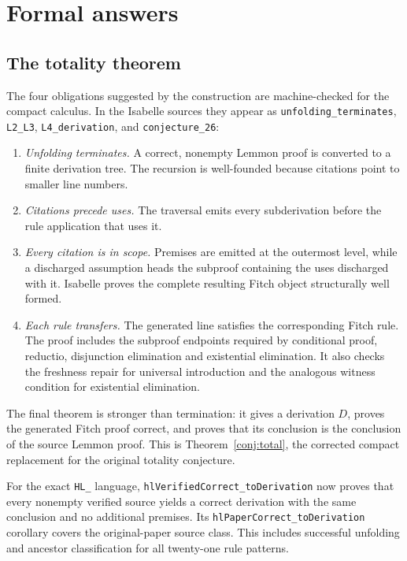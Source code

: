 \documentclass[11pt]{article}
\theoremstyle{plain}
\theoremstyle{definition}
\theoremstyle{remark}
\begin{document}
\section{Formal answers}\label{sec:open}

\subsection{The totality theorem}

The four obligations suggested by the construction are machine-checked for
the compact calculus. In the Isabelle sources they appear as
\verb|unfolding_terminates|, \verb|L2_L3|, \verb|L4_derivation|, and
\verb|conjecture_26|:

\begin{enumerate}
\item[(L1)] \emph{Unfolding terminates.} A correct, nonempty Lemmon proof is
converted to a finite derivation tree. The recursion is well-founded because
citations point to smaller line numbers.

\item[(L2)] \emph{Citations precede uses.} The traversal emits every
subderivation before the rule application that uses it.

\item[(L3)] \emph{Every citation is in scope.} Premises are emitted at the
outermost level, while a discharged assumption heads the subproof containing
the uses discharged with it. Isabelle proves the complete resulting Fitch
object structurally well formed.

\item[(L4)] \emph{Each rule transfers.} The generated line satisfies the
corresponding Fitch rule. The proof includes the subproof endpoints required
by conditional proof, reductio, disjunction elimination and existential
elimination. It also checks the freshness repair for universal introduction
and the analogous witness condition for existential elimination.
\end{enumerate}

The final theorem is stronger than termination: it gives a derivation $D$,
proves the generated Fitch proof correct, and proves that its conclusion is
the conclusion of the source Lemmon proof. This is
Theorem~\ref{conj:total}, the corrected compact replacement for the original
totality conjecture.

For the exact \verb|HL_| language, \verb|hlVerifiedCorrect_toDerivation|
now proves that every nonempty verified source yields a correct derivation
with the same conclusion and no additional premises. Its
\verb|hlPaperCorrect_toDerivation| corollary covers the original-paper
source class. This includes successful unfolding and ancestor classification
for all twenty-one rule patterns.
\end{document}
